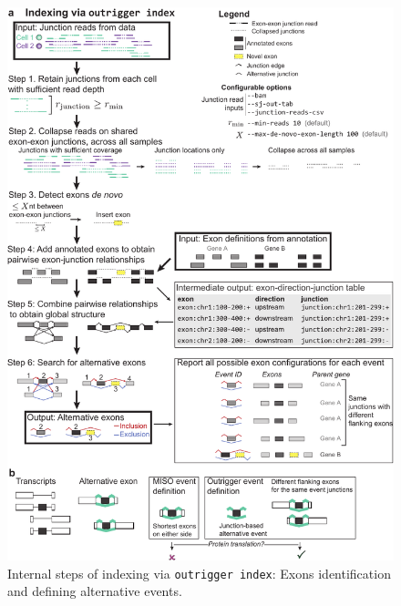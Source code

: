 \begin{figure}
  \centering
  \includegraphics[width=5.8in]{figures/outrigger_index}
  \caption[Internal steps of indexing via \texttt{outrigger index}: Exons identification and defining alternative events.]{
  Internal steps of indexing via \texttt{outrigger index}: Exons identification and defining alternative events.\\
}
\end{figure}
